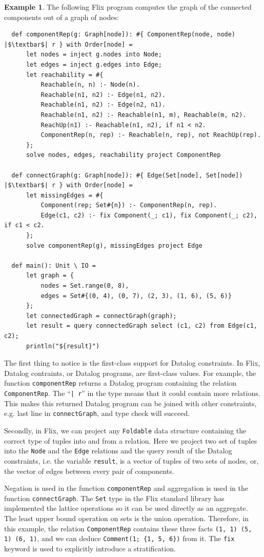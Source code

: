 \documentclass[11pt]{report}
\theoremstyle{definition}
\newtheorem{exmp}{Example}[chapter]
\begin{document}
\begin{exmp}
  The following Flix program computes the graph of the connected components out of a graph of nodes:
  \begin{verbatim}
  def componentRep(g: Graph[node]): #{ ComponentRep(node, node) |$\textbar$| r } with Order[node] =
      let nodes = inject g.nodes into Node;
      let edges = inject g.edges into Edge;
      let reachability = #{
          Reachable(n, n) :- Node(n).
          Reachable(n1, n2) :- Edge(n1, n2).
          Reachable(n1, n2) :- Edge(n2, n1).
          Reachable(n1, n2) :- Reachable(n1, m), Reachable(m, n2).
          ReachUp(n1) :- Reachable(n1, n2), if n1 < n2.
          ComponentRep(n, rep) :- Reachable(n, rep), not ReachUp(rep).
      };
      solve nodes, edges, reachability project ComponentRep

  def connectGraph(g: Graph[node]): #{ Edge(Set[node], Set[node]) |$\textbar$| r } with Order[node] =
      let missingEdges = #{
          Component(rep; Set#{n}) :- ComponentRep(n, rep).
          Edge(c1, c2) :- fix Component(_; c1), fix Component(_; c2), if c1 < c2.
      };
      solve componentRep(g), missingEdges project Edge

  def main(): Unit \ IO =
      let graph = {
          nodes = Set.range(0, 8),
          edges = Set#{(0, 4), (0, 7), (2, 3), (1, 6), (5, 6)}
      };
      let connectedGraph = connectGraph(graph);
      let result = query connectedGraph select (c1, c2) from Edge(c1, c2);
      println("${result}")
\end{verbatim}

  The first thing to notice is the first-class support for Datalog constraints. In Flix, Datalog contraints, or Datalog programs, are first-class values. For example, the function \texttt{componentRep} returns a Datalog program containing the relation \texttt{ComponentRep}. The ``\texttt{| r}'' in the type means that it could contain more relations. This makes this returned Datalog program can be joined with other constraints, e.g. last line in \texttt{connectGraph}, and type check will succeed.

  Secondly, in Flix, we can project any \texttt{Foldable} data structure containing the correct type of tuples into and from a relation. Here we project two set of tuples into the \texttt{Node} and the \texttt{Edge} relations and the query result of the Datalog constraints, i.e. the variable \texttt{result}, is a vector of tuples of two sets of nodes, or, the vector of edges between every pair of components.

  Negation is used in the function \texttt{componentRep} and aggregation is used in the function \texttt{connectGraph}. The \texttt{Set} type in the Flix standard library has implemented the lattice operations so it can be used directly as an aggregate. The least upper bound operation on sets is the union operation. Therefore, in this example, the relation \texttt{ComponentRep} contains these three facts \texttt{(1, 1) (5, 1) (6, 1)}, and we can deduce \texttt{Comment(1; \{1, 5, 6\})} from it. The \texttt{fix} keyword is used to explicitly introduce a stratification.

\end{exmp}
\label{exmp:flix-program}
\end{document}
